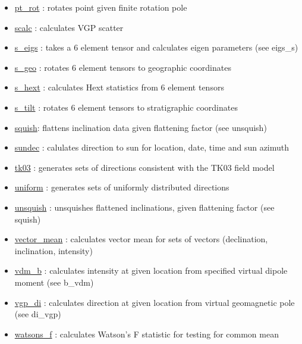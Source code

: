 \documentclass[11pt]{book}
\begin{document}
{{\begin{itemize}
\item \href{http://pmagpy.github.io/PmagPy.html#pt_rot}{pt\_rot} : rotates point given finite rotation pole
\item \href{http://pmagpy.github.io/PmagPy.html#scalc}{scalc} : calculates  VGP scatter
\item \href{http://pmagpy.github.io/PmagPy.html#s_eigs}{s\_eigs} : takes a 6 element tensor and calculates eigen parameters (see eigs\_s)
\item \href{http://pmagpy.github.io/PmagPy.html#s_geo}{s\_geo} : rotates 6 element tensors to geographic coordinates
\item \href{http://pmagpy.github.io/PmagPy.html#s_hext}{s\_hext} : calculates Hext statistics from 6 element tensors
\item \href{http://pmagpy.github.io/PmagPy.html#s_tilt}{s\_tilt} : rotates 6 element tensors to stratigraphic coordinates
\item \href{http://pmagpy.github.io/PmagPy.html#squish}{squish}: flattens inclination data given flattening factor (see unsquish)
\item \href{http://pmagpy.github.io/PmagPy.html#sundec}{sundec} : calulates direction to sun for location, date, time and sun azimuth
\item \href{http://pmagpy.github.io/PmagPy.html#tk03}{tk03} : generates sets of directions consistent with the TK03 field model
\item \href{http://pmagpy.github.io/PmagPy.html#uniform}{uniform} : generates sets of uniformly distributed directions
\item \href{http://pmagpy.github.io/PmagPy.html#unsquish}{unsquish} : unsquishes flattened inclinations, given flattening factor (see squish)
\item \href{http://pmagpy.github.io/PmagPy.html#vector_mean}{vector\_mean} : calculates vector mean for sets of vectors (declination, inclination, intensity)
\item \href{http://pmagpy.github.io/PmagPy.html#vdm_b}{vdm\_b} : calculates intensity at given location from specified virtual dipole moment (see b\_vdm)
\item \href{http://pmagpy.github.io/PmagPy.html#vgp_di}{vgp\_di} : calculates direction at given location from virtual geomagnetic pole (see di_vgp)
\item \href{http://pmagpy.github.io/PmagPy.html#watsons_f}{watsons\_f} : calculates Watson's F statistic for testing for common mean

  \end{itemize}

}}
\end{document}
